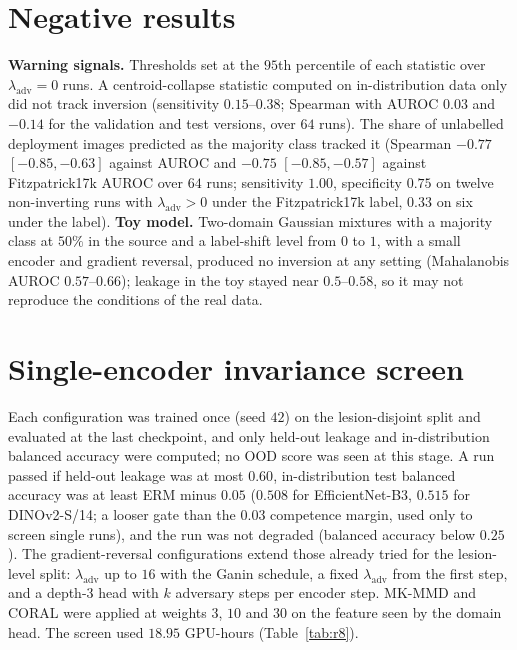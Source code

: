 \documentclass{midl}
\newcommand{\lam}{\lambda_{\mathrm{adv}}}
\begin{document}
\FloatBarrier
\section{Negative results}
\label{app:negative}

\textbf{Warning signals.} Thresholds set at the $95$th percentile of each statistic over
$\lam=0$ runs. A centroid-collapse statistic computed on in-distribution data only did not
track inversion (sensitivity $0.15$--$0.38$; Spearman with \texttt{} AUROC $0.03$
and $-0.14$ for the validation and test versions, over $64$ runs). The share
of unlabelled deployment images predicted as the majority class tracked it (Spearman $-0.77$ $[-0.85, -0.63]$ against
\texttt{} AUROC and $-0.75$ $[-0.85, -0.57]$ against Fitzpatrick17k AUROC over $64$ runs; sensitivity $1.00$, specificity $0.75$ on twelve non-inverting runs with
$\lam>0$ under the Fitzpatrick17k label, $0.33$ on six under the \texttt{} label).
\textbf{Toy model.} Two-domain Gaussian mixtures with a majority class at $50\%$ in the source
and a label-shift level from $0$ to $1$, with a small encoder and gradient reversal, produced
no inversion at any setting (Mahalanobis AUROC $0.57$--$0.66$); leakage in the toy stayed
near $0.5$--$0.58$, so it may not reproduce the conditions of the real data.

\FloatBarrier
\section{Single-encoder invariance screen}
\label{app:r8}

Each
configuration was trained once (seed $42$) on the lesion-disjoint split and evaluated at the last checkpoint, and only held-out
leakage and in-distribution balanced accuracy were computed; no OOD score was seen at this
stage. A run passed if held-out leakage was at most $0.60$, in-distribution test balanced
accuracy was at least ERM minus $0.05$ ($0.508$ for EfficientNet-B3, $0.515$ for DINOv2-S/14; a looser gate than
the $0.03$ competence margin, used only to screen single runs),
and the run was not degraded (balanced accuracy below $0.25$). The gradient-reversal
configurations extend those already tried for the lesion-level split: $\lam$ up to $16$ with the
Ganin schedule, a fixed $\lam$ from the first step, and a depth-3 head with $k$ adversary steps
per encoder step. MK-MMD and CORAL were applied at weights $3$, $10$ and $30$ on the feature seen
by the domain head. The screen used $18.95$ GPU-hours (Table~\ref{tab:r8}).
\end{document}

